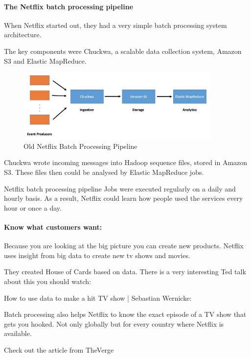 \documentclass[12pt]{scrartcl} %
\begin{document}
\paragraph{The Netflix batch processing pipeline}
When Netflix started out, they had a very simple batch processing system architecture.

The key components were Chuckwa, a scalable data collection system, Amazon S3 and Elastic MapReduce.

\begin{figure}[htbp] 
  \centering
     \includegraphics[width=0.9\textwidth]{images/Netflix-Chuckwa-Pipeline}
  \caption{Old Netflix Batch Processing Pipeline}
  \label{fig:Bild1}
\end{figure}

Chuckwa wrote incoming messages into Hadoop sequence files, stored in Amazon S3. These files then could be analysed by Elastic MapReduce jobs.

Netflix batch processing pipeline
Jobs were executed regularly on a daily and hourly basis. As a result, Netflix could learn how people used the services every hour or once a day.

\paragraph{Know what customers want:}

Because you are looking at the big picture you can create new products. Netflix uses insight from big data to create new tv shows and movies.

They created House of Cards based on data. There is a very interesting Ted talk about this you should watch:

How to use data to make a hit TV show | Sebastian Wernicke: 


Batch processing also helps Netflix to know the exact episode of a TV show that gets you hooked. Not only globally but for every country where Netflix is available.

Check out the article from TheVerge
\end{document}
